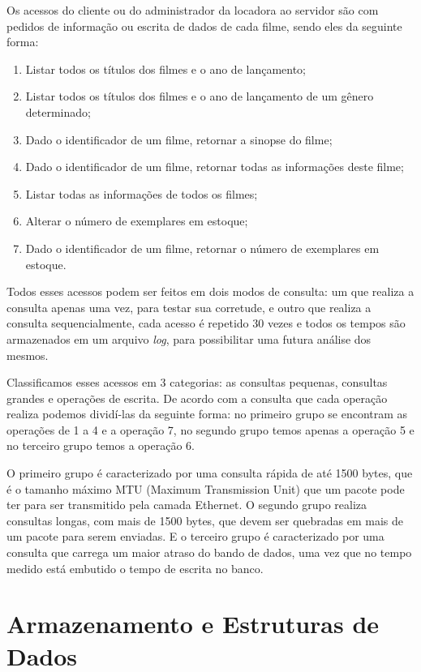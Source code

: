 \documentclass[12pt,a4paper]{article}
\newenvironment{myenumerate}{
\begin{enumerate}
 \setlength{\itemsep}{1pt}
 \setlength{\parskip}{0pt}
 \setlength{\parsep}{0pt}
}{\end{enumerate}}
\begin{document}
Os acessos do cliente ou do administrador da locadora ao servidor são com pedidos de informação ou escrita de dados de cada filme, sendo eles da seguinte forma:

\begin {myenumerate}
\item Listar todos os títulos dos filmes e o ano de lançamento;
\item Listar todos os títulos dos filmes e o ano de lançamento de um gênero determinado;
\item Dado o identificador de um filme, retornar a sinopse do filme;
\item Dado o identificador de um filme, retornar todas as informações deste filme;
\item Listar todas as informações de todos os filmes;
\item Alterar o número de exemplares em estoque;
\item Dado o identificador de um filme, retornar o número de exemplares
em estoque.
\end{myenumerate}

    Todos esses acessos podem ser feitos em dois modos de consulta: um que realiza a consulta apenas uma vez, para testar sua corretude, e outro que realiza a consulta sequencialmente, cada acesso é repetido 30 vezes e todos os tempos são armazenados em um arquivo {\it log}, para possibilitar uma futura análise dos mesmos.
    
    Classificamos esses acessos em 3 categorias: as consultas pequenas, consultas grandes e operações de escrita. De acordo com a consulta que cada operação realiza podemos dividí-las da seguinte forma: no primeiro grupo se encontram as operações de 1 a 4 e a operação 7, no segundo grupo temos apenas a operação 5 e no terceiro grupo temos a operação 6. 
    
O primeiro grupo é caracterizado por uma consulta rápida de até 1500 bytes, que é o tamanho máximo MTU (Maximum Transmission Unit) que um pacote pode ter para ser transmitido pela camada Ethernet. O segundo grupo realiza consultas longas, com mais de 1500 bytes, que devem ser quebradas em mais de um pacote para serem enviadas. E o terceiro grupo é caracterizado por uma consulta que carrega um maior atraso do bando de dados, uma vez que no tempo medido está embutido o tempo de escrita no banco.


\section{Armazenamento e Estruturas de Dados}
\end{document}
